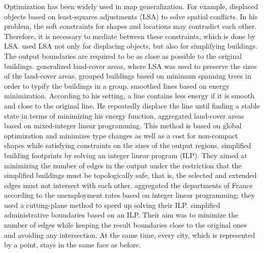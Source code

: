 Optimization has been widely used in map generalization.
For example, \textcite{Harrie1999} displaced objects 
based on least-squares adjustments (LSA)
to solve spatial conflicts.
In his problem, the soft constraints 
for shapes and locations may contradict each other.
Therefore, it is necessary 
to mediate between these constraints, 
which is done by LSA.
\textcite{Sester2005Optimization} used LSA not only for 
displacing objects, but also for simplifying buildings. 
The output boundaries are required to 
be as close as possible to the original buildings.
\textcite{Tong2015AreaLSA} generalized land-cover areas,
where LSA was used to preserve the sizes of 
the land-cover areas.
\textcite{Regnauld2001} grouped buildings based on 
minimum spanning trees in order to typify
the buildings in a group.
\textcite{Burghardt2005Snakes} smoothed lines based on 
energy minimization. 
According to his setting, a line contains less energy
if it is smooth and close to the original line.
He repeatedly displace the line 
until finding a stable state 
in terms of minimizing his energy function.
\textcite{HaunertWolff2010AreaAgg} aggregated land-cover areas
based on mixed-integer linear programming.
This method is based on global optimization and minimizes 
type changes as well as a cost for non-compact shapes 
while satisfying constraints on the sizes of the output regions.
\textcite{Haunertwolff2010Building} simplified building
footprints by solving an integer linear program (ILP).
They aimed at minimizing the number of edges in the output under 
the restriction that the simplified buildings must be 
topologically safe,
that is, the selected and extended edges must not intersect with 
each other.
\textcite{Oehrlein2017Aggregation} aggregated the departments 
of France according to the unemployment rates based on integer 
linear programming; they used a cutting-plane method to 
speed up solving their ILP.
\textcite{Funke2017Simplification} simplified 
administrative boundaries based on an ILP.
Their aim was to minimize the number of edges
while keeping the result boundaries close to the original ones
and avoiding any intersection. 
At the same time, every city, which is represented by a point, 
stays in the same face as before.




